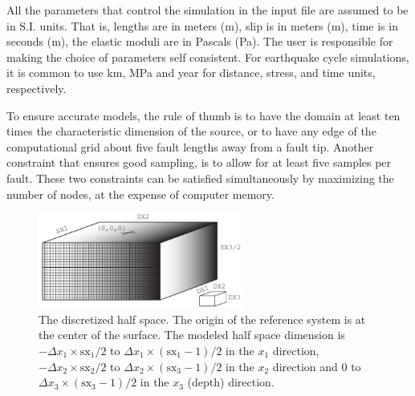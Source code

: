 \documentclass[10pt]{article}
\begin{document}
All the parameters that control the simulation in the input file are assumed to be in S.I. units. That is, lengths are in meters (m), slip is in meters (m), time is in seconds (m), the elastic moduli are in Pascals (Pa). The user is responsible for making the choice of parameters self consistent. For earthquake cycle simulations, it is common to use km, MPa and year for distance, stress, and time units, respectively.

To ensure accurate models, the rule of thumb is to have the domain at least ten times the characteristic dimension of the source, or to have any edge of the computational grid about five fault lengths away from a fault tip. Another constraint that ensures good sampling, is to allow for at least five samples per fault. These two constraints can be satisfied simultaneously by maximizing the number of nodes, at the expense of computer memory.
%
\begin{figure}[h]
\centering\includegraphics[width=0.6\textwidth]{computational_grid.pdf}
\caption{The discretized half space. The origin of the reference system is at the center of the surface. The modeled half space dimension is $-\Delta x_1\times\text{sx}_1/2$ to $\Delta x_1\times(\text{sx}_1-1)/2$ in the $x_1$ direction, $-\Delta x_2\times\text{sx}_2/2$ to $\Delta x_2\times(\text{sx}_3-1)/2$ in the $x_2$ direction and $0$ to $\Delta x_3\times(\text{sx}_3-1)/2$ in the $x_3$ (depth) direction.}
\label{fig:computation_grid}
\end{figure}
%
\end{document}
